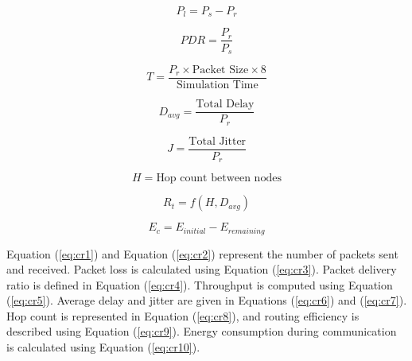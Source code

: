 \documentclass[a4paper,fleqn]{cas-dc}
\numberwithin{equation}{section}
\begin{document}
\begin{equation}
P_l = P_s - P_r
\label{eq:cr3}
\end{equation}

\begin{equation}
PDR = \frac{P_r}{P_s}
\label{eq:cr4}
\end{equation}

\begin{equation}
T = \frac{P_r \times \text{Packet Size} \times 8}{\text{Simulation Time}}
\label{eq:cr5}
\end{equation}

\begin{equation}
D_{avg} = \frac{\text{Total Delay}}{P_r}
\label{eq:cr6}
\end{equation}

\begin{equation}
J = \frac{\text{Total Jitter}}{P_r}
\label{eq:cr7}
\end{equation}

\begin{equation}
H = \text{Hop count between nodes}
\label{eq:cr8}
\end{equation}

\begin{equation}
R_t = f(H, D_{avg})
\label{eq:cr9}
\end{equation}

\begin{equation}
E_c = E_{initial} - E_{remaining}
\label{eq:cr10}
\end{equation}

Equation (\ref{eq:cr1}) and Equation (\ref{eq:cr2}) represent the number of packets sent and received. Packet loss is calculated using Equation (\ref{eq:cr3}). Packet delivery ratio is defined in Equation (\ref{eq:cr4}). Throughput is computed using Equation (\ref{eq:cr5}). Average delay and jitter are given in Equations (\ref{eq:cr6}) and (\ref{eq:cr7}). Hop count is represented in Equation (\ref{eq:cr8}), and routing efficiency is described using Equation (\ref{eq:cr9}). Energy consumption during communication is calculated using Equation (\ref{eq:cr10}).
\clearpage
\end{document}
